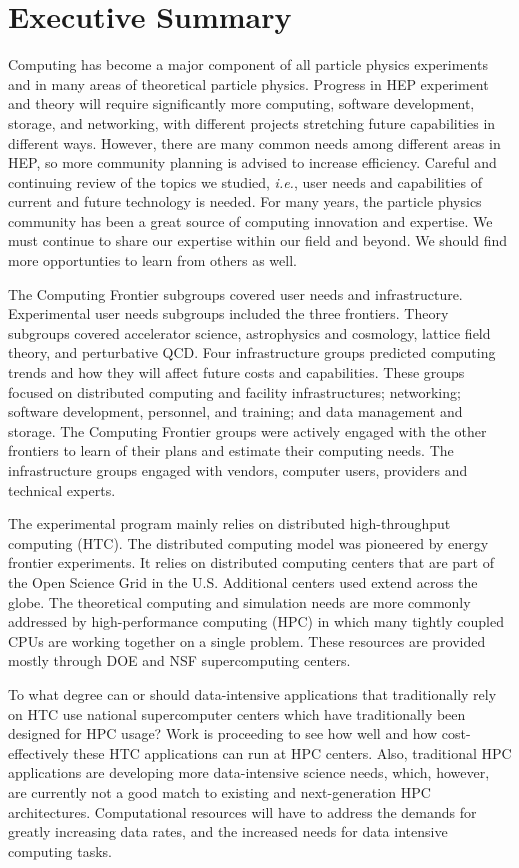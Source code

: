 

\section{Executive Summary}

Computing has become a major component of all particle physics experiments
and in many areas of theoretical particle physics. 
Progress in HEP experiment and theory will require significantly more
computing, software development, storage, and networking, with different
projects stretching future capabilities in different ways.  However, there
are many common needs among different areas in HEP, so more
community planning is advised to increase efficiency.
Careful and continuing review of the topics we studied, 
{\it i.e.}, user needs and capabilities of
current and future technology is needed.  For many years, the particle physics
community has been a great source of computing innovation and expertise. 
We must continue to share our expertise within our field and beyond.
We should find more opportunties to learn from others as well.

The Computing Frontier
subgroups covered user needs and infrastructure.
Experimental user needs subgroups included the three frontiers.
Theory subgroups covered accelerator science,
astrophysics and cosmology, lattice field theory, and perturbative QCD.
Four infrastructure groups predicted computing trends and
how they will affect future costs and
capabilities. These groups focused on distributed computing and facility
infrastructures; networking; software development, personnel, and training; and
data management and storage. 
The Computing
Frontier groups were actively engaged with the other frontiers to learn of
their plans and estimate their computing needs.  The infrastructure groups
engaged with vendors, computer users, providers and technical experts. 

The experimental program mainly relies on distributed
high-throughput computing (HTC). 
The distributed computing model was pioneered by energy frontier
experiments.  It relies on distributed computing
centers that are part of the Open Science Grid in the U.S.  
Additional centers used extend across the globe. 
The theoretical computing and simulation needs are more commonly
addressed by high-performance computing (HPC) in which many
tightly coupled CPUs are working together on a single
problem. These resources are provided mostly through DOE and NSF
supercomputing centers.

To what degree can or should data-intensive applications that traditionally 
rely on HTC use national supercomputer centers which have traditionally 
been designed for HPC usage?
Work is proceeding to see how well and how cost-effectively these HTC
applications can run at HPC centers.
Also, traditional HPC applications are developing more data-intensive
science needs, which, however, are currently not a good match to existing
and next-generation HPC architectures. Computational resources will have to
address the demands for greatly increasing data rates, and the increased
needs for data intensive computing tasks.

